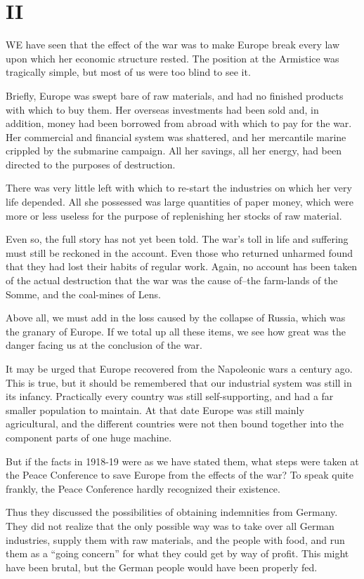 \documentclass{book}
\begin{document}
\section*{II}
WE have seen that the effect of the war was to make Europe break every law upon which her economic structure rested. The position at the Armistice was tragically simple, but most of us were too blind to see it.

Briefly, Europe was swept bare of raw materials, and had no finished products with which to buy them. Her overseas investments had been sold and, in addition, money had been borrowed from abroad with which to pay for the war. Her commercial and financial system was shattered, and her mercantile marine crippled by the submarine campaign. All her savings, all her energy, had been directed to the purposes of destruction.

There was very little left with which to re-start the industries on which her very life depended. All she possessed was large quantities of paper money, which were more or less useless for the purpose of replenishing her stocks of raw material.

Even so, the full story has not yet been told. The war’s toll in life and suffering must still be reckoned in the account. Even those who returned unharmed found that they had lost their habits of regular work. Again, no account has been taken of the actual destruction that the war was the cause of–the farm-lands of the Somme, and the coal-mines of Lens.

Above all, we must add in the loss caused by the collapse of Russia, which was the granary of Europe. If we total up all these items, we see how great was the danger facing us at the conclusion of the war.

It may be urged that Europe recovered from the Napoleonic wars a century ago. This is true, but it should be remembered that our industrial system was still in its infancy. Practically every country was still self-supporting, and had a far smaller population to maintain. At that date Europe was still mainly agricultural, and the different countries were not then bound together into the component parts of one huge machine.

But if the facts in 1918-19 were as we have stated them, what steps were taken at the Peace Conference to save Europe from the effects of the war? To speak quite frankly, the Peace Conference hardly recognized their existence.

Thus they discussed the possibilities of obtaining indemnities from Germany. They did not realize that the only possible way was to take over all German industries, supply them with raw materials, and the people with food, and run them as a “going concern” for what they could get by way of profit. This might have been brutal, but the German people would have been properly fed.
\end{document}
